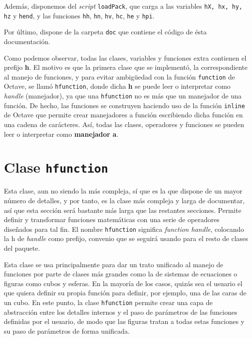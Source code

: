 \documentclass{article}
\begin{document}
Además, disponemos del \textit{script} \texttt{loadPack}, que carga a
las variables \texttt{hX, hx, hy, hz} y \texttt{hend}, y las funciones
\texttt{hh}, \texttt{hn}, \texttt{hv}, \texttt{hc}, \texttt{he} y
\texttt{hpi}.

Por último, dispone de la carpeta \texttt{doc} que contiene el código
de ésta documentación.

Como podemos observar, todas las clases, variables y funciones extra
contienen el prefijo \textbf{h}. El motivo es que la primera clase que
se implementó, la correspondiente al manejo de funciones, y para
evitar ambigüedad con la función \texttt{function} de Octave, se llamó
\texttt{hfunction}, donde dicha \textbf{h} se puede leer o interpretar
como \textit{handle} (manejador), ya que una \texttt{hfunction} no es
más que un manejador de una función. De hecho, las funciones se
construyen haciendo uso de la función \texttt{inline} de Octave que
permite crear manejadores a función escribiendo dicha función en una
cadena de carácteres. Así, todas las clases, operadores y funciones se
pueden leer o interpretar como \textbf{manejador a}.

\section{Clase \texttt{hfunction}}
\label{sec:hfun}
Esta clase, aun no siendo la más compleja, sí que es la que dispone de
un mayor número de detalles, y por tanto, es la clase más compleja y
larga de documentar, así que esta sección será bastante más larga que
las restantes secciones. Permite definir y transformar funciones
matemáticas con una serie de operadores diseñados para tal fin. El
nombre \texttt{hfunction} significa \textit{function handle},
colocando la h de \textit{handle} como prefijo, convenio que se
seguirá usando para el resto de clases del paquete.

Esta clase se usa principalmente para dar un trato unificado al manejo
de funciones por parte de clases más grandes como la de sistemas de
ecuaciones o figuras como cubos y esferas. En la mayoría de los casos,
quizás sea el usuario el que quiera definir su propia función para
definir, por ejemplo, una de las caras de un cubo. En este punto, la clase
\texttt{hfunction} permite crear una capa de abstracción entre los
detalles internos y el paso de parámetros de las funciones definidas
por el usuario, de modo que las figuras tratan a todas estas funciones
y su paso de parámetros de forma unificada.
\end{document}

